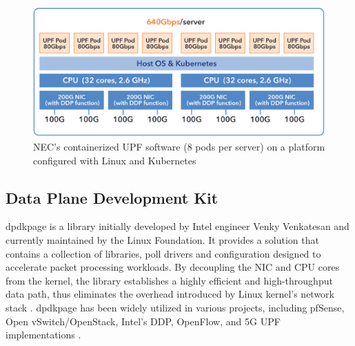 \begin{figure}[H]
	\centering
	\includegraphics[width=1.0\textwidth]{resources/images/640_nec_upf_system.PNG}
	\caption{NEC's containerized UPF software (8 pods per server) on a platform configured with Linux and Kubernetes \cite{nec_upf_whitepaper}}
    \label{fig:related_work:640_nec_upf_system}
\end{figure}

\subsection{Data Plane Development Kit}

\ac{dpdkpage} is a library initially developed by Intel engineer Venky Venkatesan and currently maintained by the Linux Foundation. 
It provides a solution that contains a collection of libraries, poll drivers and configuration designed to accelerate packet processing workloads. 
By decoupling the NIC and CPU cores from the kernel, the library establishes a highly efficient and high-throughput data path, thus eliminates the overhead introduced by Linux kernel's network stack \cite{kourtis_enhancing_2015}. 
\ac{dpdkpage} has been widely utilized in various projects, including pfSense, Open vSwitch/OpenStack, Intel's DDP, OpenFlow, and 5G UPF implementations \cite{intel_ddp_ethernet_800}\cite{pongracz_removing_2013}\cite{zte_5g_core_upf_impl}\cite{nec_upf_whitepaper}. 

